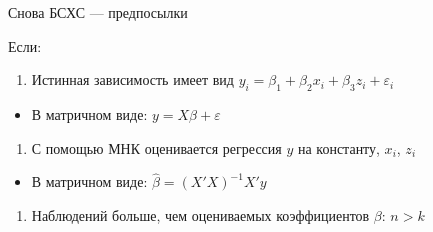 \documentclass[ignorenonframetext,]{beamer}
\begin{document}
\begin{frame}{Снова БСХС --- предпосылки}

Если:

\begin{enumerate}
\def\labelenumi{\arabic{enumi}.}
\itemsep1pt\parskip0pt
\item
  Истинная зависимость имеет вид
  \(y_i=\beta_1 + \beta_2 x_i + \beta_3 z_i+\varepsilon_i\)
\end{enumerate}

\begin{itemize}
\itemsep1pt\parskip0pt
\item
  В матричном виде: \(y=X\beta + \varepsilon\)
\end{itemize}

\begin{enumerate}
\def\labelenumi{\arabic{enumi}.}
\setcounter{enumi}{1}
\itemsep1pt\parskip0pt
\item
  С помощью МНК оценивается регрессия \(y\) на константу, \(x_i\),
  \(z_i\)
\end{enumerate}

\begin{itemize}
\itemsep1pt\parskip0pt
\item
  В матричном виде: \(\hat{\beta}=(X'X)^{-1}X'y\)
\end{itemize}

\begin{enumerate}
\def\labelenumi{\arabic{enumi}.}
\setcounter{enumi}{2}
\itemsep1pt\parskip0pt
\item
  Наблюдений больше, чем оцениваемых коэффициентов \(\beta\): \(n>k\)
\end{enumerate}

\end{frame}
\end{document}
